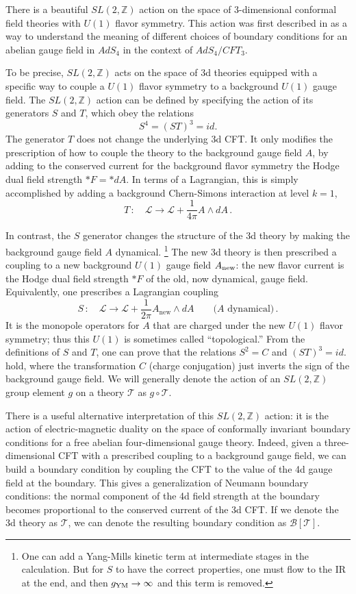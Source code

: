 \documentclass[hyper,letterpaper]{JHEP3}
\numberwithin{equation}{section}
\newcommand{\be}{\begin{equation}}
\newcommand{\ee}{\end{equation}}
\newcommand{\Z}{{\mathbb Z}}
\newcommand{\CB}{\mathcal{B}}
\newcommand{\CL}{\mathcal{L}}
\newcommand{\CT}{\mathcal{T}}
\begin{document}
There is a beautiful $SL(2,\Z)$ action on the space of 3-dimensional conformal field theories with $U(1)$ flavor symmetry. This action was first described in \cite{Witten-SL2} as a way to understand
the meaning of different choices of boundary conditions for an abelian gauge field in $AdS_4$ in the context of $AdS_4/CFT_3$.

To be precise, $SL(2,\Z)$ acts on the space of 3d theories equipped with a specific way to couple a $U(1)$ flavor symmetry to a background $U(1)$ gauge field.
The $SL(2,\Z)$ action can be defined by specifying the action of its generators $S$ and $T$, which obey the relations
%
\be S^4 = (ST)^3 = id.\ee
%
The generator $T$ does not change the underlying 3d CFT. It only modifies the prescription
of how to couple the theory to the background gauge field $A$, by adding to the conserved current for the background flavor symmetry the Hodge dual field strength $*F=*dA$. In terms of a Lagrangian, this is simply accomplished by adding a background Chern-Simons interaction at level $k=1$,
%
\be T\,:\quad \CL\to \CL + \frac{1}{4\pi} A\wedge dA\,. \ee

In contrast, the $S$ generator changes the structure of the 3d theory by making the background gauge field $A$ dynamical.%
%
\footnote{One can add a Yang-Mills kinetic term at intermediate stages in the calculation. But for $S$ to have the correct properties, one must flow to the IR at the end, and then $g_{{\rm YM}}\to \infty$ and this term is removed.} %
%
The new 3d theory is then prescribed a coupling to a new background $U(1)$ gauge field $A_{\rm new}$: the new flavor current is the Hodge dual field strength $*F$ of the old, now dynamical, gauge field. Equivalently, one prescribes a Lagrangian coupling
%
\be S\,:\quad \CL\to \CL+ \frac{1}{2 \pi} A_{\mathrm{new}} \wedge dA \qquad\text{($A$ dynamical)}\,.\ee
%
It is the monopole operators for $A$ that are charged under the new $U(1)$ flavor symmetry; thus this $U(1)$ is sometimes called ``topological.'' From the definitions of $S$ and $T$, one can prove that the relations $S^2=C$ and $(ST)^3=id.$ hold, where the transformation $C$ (charge conjugation) just inverts the sign of the background gauge field. We will generally denote the action of an $SL(2,\Z)$ group element $g$ on a theory $\CT$ as $g \circ \CT$.

There is a useful alternative interpretation of this $SL(2,\Z)$ action: it is the action of electric-magnetic duality
on the space of conformally invariant boundary conditions for a free abelian four-dimensional gauge theory.
Indeed, given a three-dimensional CFT with a prescribed coupling to a background gauge field,
we can build a boundary condition by coupling the CFT to the value of the 4d gauge field at the boundary.
This gives a generalization of Neumann boundary conditions: the normal component of the 4d field strength
at the boundary becomes proportional to the conserved current of the 3d CFT. If we denote the 3d theory as $\CT$,
we can denote the resulting boundary condition as $\CB[\CT]$.
\end{document}
